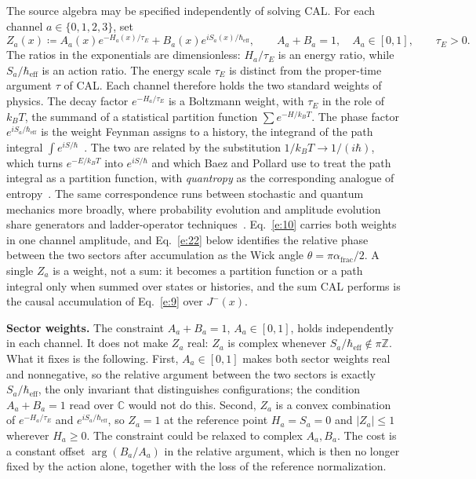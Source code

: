 \documentclass[10pt]{article}
\newcommand{\afrac}{\alpha_{\mathrm{frac}}}
\newcommand{\hbareff}{\hbar_{\mathrm{eff}}}
\begin{document}
The source algebra may be specified independently of solving CAL. For each channel $a\in\{0,1,2,3\}$, set
\begin{equation}
Z_a(x)\coloneqq A_a(x)e^{-H_a(x)/\tau_E}+B_a(x)e^{iS_a(x)/\hbareff},\qquad A_a+B_a=1,\quad A_a\in[0,1],\qquad \tau_E>0.\label{e:10}
\end{equation}
The ratios in the exponentials are dimensionless: $H_a/\tau_E$ is an energy ratio, while $S_a/\hbareff$ is an action ratio. The energy scale $\tau_E$ is distinct from the proper-time argument $\tau$ of CAL. Each channel therefore holds the two standard weights of physics. The decay factor $e^{-H_a/\tau_E}$ is a Boltzmann weight, with $\tau_E$ in the role of $k_BT$, the summand of a statistical partition function $\sum e^{-H/k_BT}$. The phase factor $e^{iS_a/\hbareff}$ is the weight Feynman assigns to a history, the integrand of the path integral $\int e^{iS/\hbar}$~\cite{feynman}. The two are related by the substitution $1/k_BT\to1/(i\hbar)$, which turns $e^{-E/k_BT}$ into $e^{iS/\hbar}$ and which Baez and Pollard use to treat the path integral as a partition function, with \emph{quantropy} as the corresponding analogue of entropy~\cite{quantropy}. The same correspondence runs between stochastic and quantum mechanics more broadly, where probability evolution and amplitude evolution share generators and ladder-operator techniques~\cite{baezbiamonte,doi}. Eq.~\eqref{e:10} carries both weights in one channel amplitude, and Eq.~\eqref{e:22} below identifies the relative phase between the two sectors after accumulation as the Wick angle $\theta=\pi\afrac/2$. A single $Z_a$ is a weight, not a sum: it becomes a partition function or a path integral only when summed over states or histories, and the sum CAL performs is the causal accumulation of Eq.~\eqref{e:9} over $J^-(x)$.

\noindent\textbf{Sector weights.} The constraint $A_a+B_a=1$, $A_a\in[0,1]$, holds independently in each channel. It does not make $Z_a$ real: $Z_a$ is complex whenever $S_a/\hbareff\notin\pi\mathbb Z$. What it fixes is the following. First, $A_a\in[0,1]$ makes both sector weights real and nonnegative, so the relative argument between the two sectors is exactly $S_a/\hbareff$, the only invariant that distinguishes configurations; the condition $A_a+B_a=1$ read over $\mathbb C$ would not do this. Second, $Z_a$ is a convex combination of $e^{-H_a/\tau_E}$ and $e^{iS_a/\hbareff}$, so $Z_a=1$ at the reference point $H_a=S_a=0$ and $|Z_a|\le1$ wherever $H_a\ge0$. The constraint could be relaxed to complex $A_a,B_a$. The cost is a constant offset $\arg(B_a/A_a)$ in the relative argument, which is then no longer fixed by the action alone, together with the loss of the reference normalization.
\end{document}
